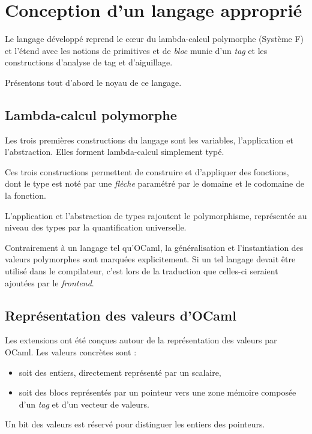 \chapter{Conception d'un langage approprié}

Le langage développé reprend le cœur du lambda-calcul polymorphe (Système F)
et l'étend avec les notions de primitives et de \emph{bloc} munie d'un
\emph{tag} et les constructions d'analyse de tag et d'aiguillage.

Présentons tout d'abord le noyau de ce langage.

\section{Lambda-calcul polymorphe} 

Les trois premières constructions du langage sont les variables, l'application
et l'abstraction. Elles forment lambda-calcul simplement typé.

Ces trois constructions permettent de construire et d'appliquer des fonctions,
dont le type est noté par une \emph{flèche} paramétré par le domaine et le
codomaine de la fonction.

L'application et l'abstraction de types rajoutent le polymorphisme, représentée
au niveau des types par la quantification universelle.

Contrairement à un langage tel qu'OCaml, la généralisation et l'instantiation
des valeurs polymorphes sont marquées explicitement. Si un tel langage devait
être utilisé dans le compilateur, c'est lors de la traduction que celles-ci
seraient ajoutées par le \emph{frontend}.

\section{Représentation des valeurs d'OCaml}

Les extensions ont été conçues autour de la représentation des valeurs par
OCaml. Les valeurs concrètes sont :
\begin{itemize}
  \item soit des entiers, directement représenté par un scalaire,
  \item soit des blocs représentés par un pointeur vers une
zone mémoire composée d'un \emph{tag} et d'un vecteur de valeurs.
\end{itemize}
Un bit des valeurs est réservé pour distinguer les entiers des pointeurs.

